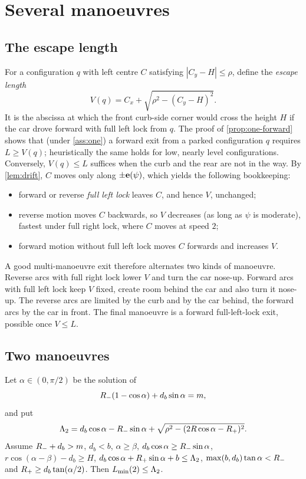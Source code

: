 \section{Several manoeuvres}\label{sec:several}

\subsection{The escape length}
For a configuration $q$ with left centre $C$ satisfying $|C_y-H|\le\rho$, define the \emph{escape length}
\[
  V(q)=C_x+\sqrt{\rho^2-(C_y-H)^2}.
\]
It is the abscissa at which the front curb-side corner would cross the height $H$ if the car drove forward with full left lock from $q$.
The proof of \cref{prop:one-forward} shows that (under \cref{ass:one}) a forward exit from a parked configuration $q$ requires $L\ge V(q)$; heuristically the same holds for low, nearly level configurations.
Conversely, $V(q)\le L$ suffices when the curb and the rear are not in the way.
By \cref{lem:drift}, $C$ moves only along $\pm\mathbf{e}(\psi)$, which yields the following bookkeeping:
\begin{itemize}[nosep]
\item forward or reverse \emph{full left lock} leaves $C$, and hence $V$, unchanged;
\item reverse motion moves $C$ backwards, so $V$ decreases (as long as $\psi$ is moderate), fastest under full right lock, where $C$ moves at speed $2$;
\item forward motion without full left lock moves $C$ forwards and increases $V$.
\end{itemize}
A good multi-manoeuvre exit therefore alternates two kinds of manoeuvre.
Reverse arcs with full right lock lower $V$ and turn the car nose-up.
Forward arcs with full left lock keep $V$ fixed, create room behind the car and also turn it nose-up.
The reverse arcs are limited by the curb and by the car behind, the forward arcs by the car in front.
The final manoeuvre is a forward full-left-lock exit, possible once $V\le L$.

\subsection{Two manoeuvres}

\begin{proposition}\label{prop:two}
Let $\alpha\in(0,\pi/2)$ be the solution of
\begin{equation}\label{eq:alpha2}
  R_{-}(1-\cos\alpha)+d_b\sin\alpha=m ,
\end{equation}
and put
\[
  \Lambda_2=d_b\cos\alpha-R_{-}\sin\alpha+\sqrt{\rho^2-(2R\cos\alpha-R_{+})^2}.
\]
Assume $R_{-}+d_b>m$, $d_b<b$, $\alpha\ge\beta$, $d_b\cos\alpha\ge R_{-}\sin\alpha$, $r\cos(\alpha-\beta)-d_b\ge H$, $d_b\cos\alpha+R_{+}\sin\alpha+b\le\Lambda_2$, $\max(b,d_b)\tan\alpha<R_{-}$ and $R_{+}\ge d_b\tan(\alpha/2)$.
Then $L_{\min}(2)\le\Lambda_2$.
\end{proposition}

